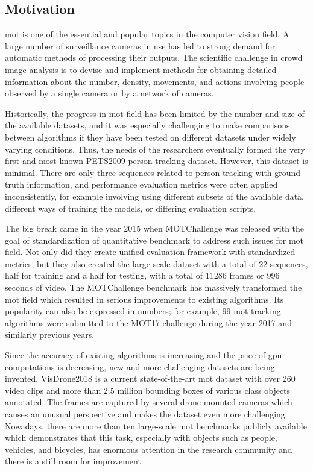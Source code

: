 \begin{introduction}
\section{Motivation}
    \gls{mot} is one of the essential and popular topics in the computer vision field. A large number of surveillance cameras in use has led to strong demand for automatic methods of processing their outputs. The scientific challenge in crowd image analysis is to devise and implement methods for obtaining detailed information about the number, density, movements, and actions involving people observed by a single camera or by a network of cameras.  
    
    Historically, the progress in \gls{mot} field has been limited by the number and size of the available datasets, and it was especially challenging to make comparisons between algorithms if they have been tested on different datasets under widely varying conditions. Thus, the needs of the researchers eventually formed the very first and most known PETS2009 \cite{ferryman2009pets2009} person tracking dataset. However, this dataset is minimal. There are only three sequences related to person tracking with ground-truth information, and performance evaluation metrics were often applied inconsistently, for example involving using different subsets of the available data, different ways of training the models, or differing evaluation scripts. \cite{MOTChallenge2015}
    
    The big break came in the year 2015 when MOTChallenge \cite{MOTChallenge2015} was released with the goal of standardization of quantitative benchmark to address such issues for \gls{mot} field. Not only did they create unified evaluation framework with standardized metrics, but they also created the large-scale dataset with a total of 22 sequences, half for training and a half for testing, with a total of 11286 frames or 996 seconds of video. The MOTChallenge \cite{MOTChallenge2015} benchmark has massively transformed the \gls{mot} field which resulted in serious improvements to existing algorithms. Its popularity can also be expressed in numbers; for example, 99 \gls{mot} tracking algorithms were submitted to the MOT17 challenge \cite{mot16} during the year 2017 and similarly previous years. 
    
    Since the accuracy of existing algorithms is increasing and the price of \gls{gpu} computations is decreasing, new and more challenging datasets are being invented. VisDrone2018 \cite{zhuvisdrone2018} is a current state-of-the-art \gls{mot} dataset with over 260 video clips and more than 2.5 million bounding boxes of various class objects annotated. The frames are captured by several drone-mounted cameras which causes an unusual perspective and makes the dataset even more challenging. Nowadays, there are more than ten large-scale \gls{mot} benchmarks publicly available which demonstrates that this task, especially with objects such as people, vehicles, and bicycles, has enormous attention in the research community and there is a still room for improvement. 
    

\end{introduction}
